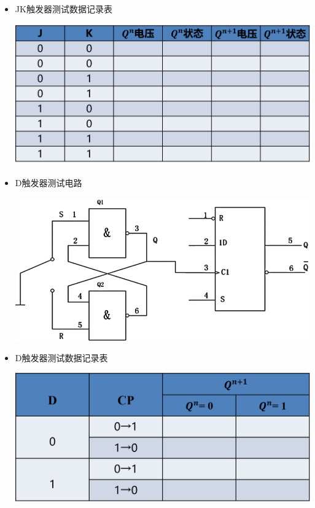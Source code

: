 \documentclass[UTF8]{ctexart}
\begin{document}
\begin{enumerate}
\begin{itemize}
                  \item JK触发器测试数据记录表  
                        \begin{center}
                              \includegraphics[scale = 0.6]{7.png}
                        \end{center}
                  \item D触发器测试电路  
                        \begin{center}
                              \includegraphics[scale = 0.6]{8.png}
                        \end{center}
                  \item D触发器测试数据记录表  
                        \begin{center}
                              \includegraphics[scale = 0.6]{9.png}
                        \end{center}
            \end{itemize}
\end{enumerate}
\end{document}
